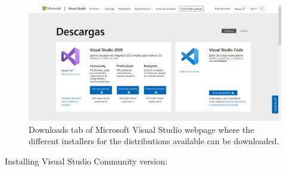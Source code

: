 \begin{figure}
    \centering
    \includegraphics[width= \textwidth]{Figures/VisualDownload}
    \caption{Downloads tab of Microsoft Visual Studio webpage where the different installers for the distributions available can be downloaded.}
    \label{fig:VisualDownload}
\end{figure}

\newpage
Installing Visual Studio Community version:

